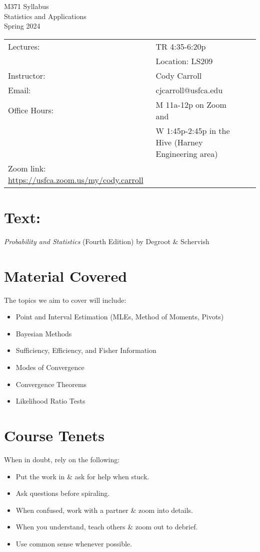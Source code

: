 \documentclass[10pt, oneside]{article}
\begin{document}
\begin{center} \Large{M371 Syllabus\\
		Statistics and Applications\\Spring 2024} \end{center} 
\begin{table}[ht]
\begin{tabular}{llll}
 Lectures:&  TR 4:35-6:20p	\\
 & Location: LS209 \\ 
 Instructor: & Cody Carroll &  \\
 Email:  & cjcarroll@usfca.edu & \\ 
 Office Hours: & M 11a-12p on Zoom and \\
 & W 1:45p-2:45p in the Hive (Harney Engineering area) \\
 Zoom link: \url{https://usfca.zoom.us/my/cody.carroll}\\
\end{tabular}
\end{table}

\section*{Text:} 
\textit{Probability and Statistics} (Fourth Edition) by Degroot \& Schervish
\renewcommand\labelitemi{$\vcenter{\hbox{\tiny$\blacksquare$}}$}
\section*{Material Covered}
The topics we aim to cover will include:
\begin{itemize}
	\itemsep0em
	\item Point and Interval Estimation (MLEs, Method of Moments, Pivots)
	\item Bayesian Methods
	\item Sufficiency, Efficiency, and Fisher Information
	\item Modes of Convergence
	\item Convergence Theorems
	\item Likelihood Ratio Tests 
\end{itemize}

\section*{Course Tenets}
When in doubt, rely on the following:
\begin{itemize}
	\itemsep0em
	\item Put the work in \& ask for help when stuck.
	\item Ask questions before spiraling.
	\item When confused, work with a partner \& zoom into details.
	\item When you understand, teach others \& zoom out to debrief.
	\item Use common sense whenever possible.
\end{itemize}
\end{document}
